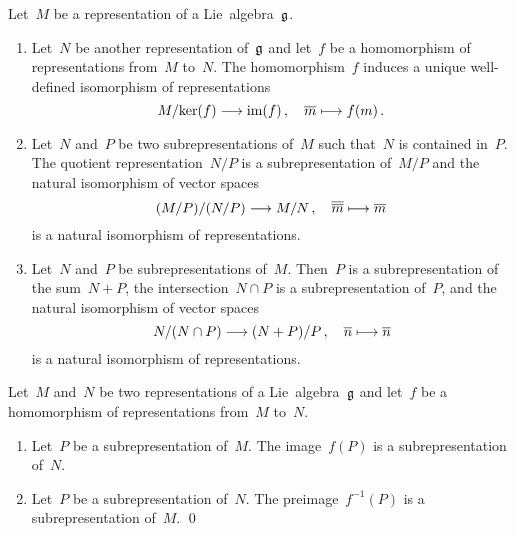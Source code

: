 \begin{corollary}
	Let~$M$ be a representation of a Lie~algebra~$\mathfrak{g}$.
	\begin{enumerate}
		\item
			Let~$N$ be another representation of~$\mathfrak{g}$ and let~$f$ be a homomorphism of representations from~$M$ to~$N$.
			The homomorphism~$f$ induces a unique well-defined isomorphism of representations
			\[
				M/{\ker(f)}
				\to
				\im(f) \,,
				\quad
				\class{m}
				\mapsto
				f(m)  \,.
			\]
		\item
			Let~$N$ and~$P$ be two subrepresentations of~$M$ such that~$N$ is contained in~$P$.
			The quotient representation~$N/P$ is a subrepresentation of~$M/P$ and the natural isomorphism of vector spaces
			\[
				(M/P) / (N/P)
				\to
				M/N \,,
				\quad
				\class{\class{m}}
				\mapsto
				\class{m}
			\]
			is a natural isomorphism of representations.
		\item
			Let~$N$ and~$P$ be subrepresentations of~$M$.
			Then~$P$ is a subrepresentation of the sum~$N+P$, the intersection~$N \cap P$ is a subrepresentation of~$P$, and the natural isomorphism of vector spaces
			\[
				N/(N \cap P)
				\to
				(N + P)/P  \,,
				\quad
				\class{n}
				\mapsto
				\class{n}
			\]
			is a natural isomorphism of representations.
	\end{enumerate}
\end{corollary}


\begin{lemma}
	Let~$M$ and~$N$ be two representations of a Lie~algebra~$\mathfrak{g}$ and let~$f$ be a homomorphism of representations from~$M$ to~$N$.
	\begin{enumerate}
		\item
			Let~$P$ be a subrepresentation of~$M$.
			The image~$f(P)$ is a subrepresentation of~$N$.
		\item
			Let~$P$ be a subrepresentation of~$N$.
			The preimage~$f^{-1}(P)$ is a subrepresentation of~$M$.
		\qed
	\end{enumerate}
\end{lemma}


